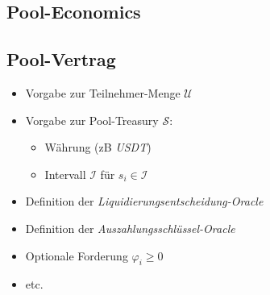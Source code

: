 \vspace{0.5cm}

\subsection{Pool-Economics}

\vspace{0.3cm}





\vspace{0.5cm}

\subsection{Pool-Vertrag}

\vspace{0.3cm}


\begin{itemize}
  \item Vorgabe zur Teilnehmer-Menge $\mathcal{U}$
  \item Vorgabe zur Pool-Treasury $\mathcal{S}$:
  \begin{itemize}
  	\item Währung (zB \textit{USDT})
  	\item Intervall $\mathcal{I}$ für $s_i \in \mathcal{I}$
  \end{itemize}
  \item Definition der \textit{Liquidierungsentscheidung-Oracle}
  \item Definition der \textit{Auszahlungsschlüssel-Oracle}
  \item Optionale Forderung $\varphi_i \geq 0$
  \item etc.
\end{itemize}

\vspace{0.5cm}


